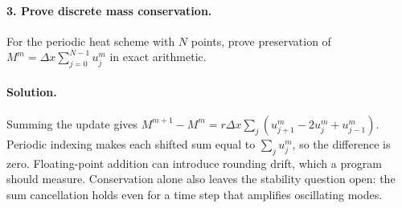 \paragraph{3. Prove discrete mass conservation.}
For the periodic heat scheme with $N$ points, prove preservation of
$M^m=\Delta x\sum_{j=0}^{N-1}u_j^m$ in exact arithmetic.

\paragraph{Solution.}
Summing the update gives
$M^{m+1}-M^m=r\Delta x\sum_j(u_{j+1}^m-2u_j^m+u_{j-1}^m)$.
Periodic indexing makes each shifted sum equal to $\sum_j u_j^m$,
so the difference is zero. Floating-point addition can introduce rounding
drift, which a program should measure. Conservation alone also leaves the
stability question open: the sum cancellation holds even for a time step
that amplifies oscillating modes.


